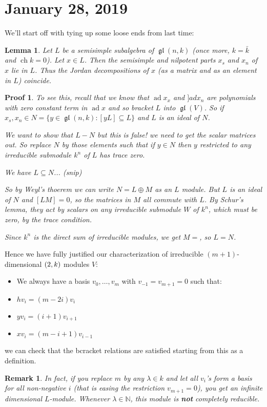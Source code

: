\documentclass[12pt]{article}
\theoremstyle{nonumberbreak}
\theoremstyle{changebreak}
\newtheorem{lem}[thm]{Lemma}
\theoremstyle{nonumberbreak}
\newtheorem{prf}{Proof}
\theoremstyle{change}
\newtheorem{rmk}[thm]{Remark}
\newcommand*{\N}{
\mathbb{N}
}
\DeclareMathOperator{\ch}{ch}
\DeclareMathOperator{\gl}{\mathfrak{gl}}
\let\sl\relax
\DeclareMathOperator{\sl}{\mathfrak{sl}}
\DeclareMathOperator{\ad}{ad}
\begin{document}
\section{January 28, 2019}
We'll start off with tying up some loose ends from last time: 
\begin{lem}
	Let $L$ be a semisimple subalgebra of $\gl(n,k)$ (once more, $k=\bar k$ and $\ch k=0$). Let $x\in L$. Then 
	the semisimple and nilpotent parts $x_s$ and $x_n$ of $x$ lie in $L$. Thus the Jordan decompositions of $x$ 
	(as a matrix and as an element in $L$) coincide.
\end{lem}
\begin{prf}
	To see this, recall that we know that $\ad x_x$ and $]ad x_n$ are polynomials with zero constant term in $\ad x$ and
	so bracket $L$ into $\gl(V)$. So if $x_s,x_n\in N=\{y\in\gl(n,k):[yL]\subseteq L\}$ and $L$ is an ideal of $N$.

	We want to show that $L-N$ but this is false! we need to get the scalar matrices out. So replace $N$ by those elements 
	such that if $y\in N$ then $y$ restricted to any irreducible submodule $k^n$ of $L$ has trace zero.

	We have $L\subseteq N$... (snip)

	So by Weyl's thoerem we can write $N=L\oplus M$ as an $L$ module. But $L$ is an ideal of $N$ and $[LM]=0$, so the matrices in $M$
	all commute with $L$. By Schur's lemma, they act by scalars on any irreducible submodule $W$ of $k^n$, which must be zero, by the trace condition.

	Since $k^n$ is the direct sum of irreducible modules, we get $M=$, so $L=N$.
\end{prf}

Hence we have fully justified our characterization of irreducible $(m+1)$-dimensional $\sl(2,k)$ modules $V$:
\begin{itemize}
	\item We always have a basis $v_0,\dots,v_m$ with $v_{-1}=v_{m+1}=0$ such that:
	\item $hv_i=(m-2i)v_i$
	\item $yv_i=(i+1)v_{i+1}$
	\item $xv_i=(m-i+1)v_{i-1}$
\end{itemize}
we can check that the bcracket relations are satisfied starting from this as a definition.
\begin{rmk}
	In fact, if you replace $m$ by any $\lambda\in k$ and let all $v_i$'s form a basis for all non-negative $i$ (that is easing
	the restriction $v_{m+1}=0$), you get an infinite dimensional $L$-module. Whenever $\lambda\in\N$, this module is \textbf{not}
	completely reducible.
\end{rmk}
\end{document}
